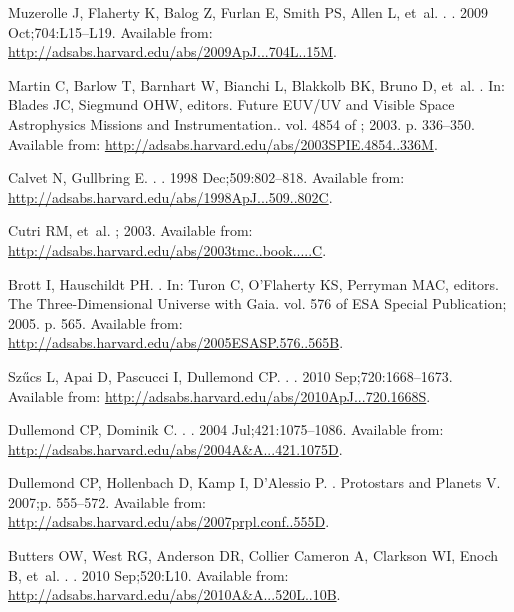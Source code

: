 \documentclass[]{rsos}
\begin{document}
\begin{thebibliography}{10}
{Muzerolle} J, {Flaherty} K, {Balog} Z, {Furlan} E, {Smith} PS, {Allen} L,
  et~al.
.
\newblock \apjl. 2009 Oct;704:L15--L19.
\newblock Available from:
  \url{http://adsabs.harvard.edu/abs/2009ApJ...704L..15M}.

{Martin} C, {Barlow} T, {Barnhart} W, {Bianchi} L, {Blakkolb} BK, {Bruno} D,
  et~al.
.
\newblock In: {Blades} JC, {Siegmund} OHW, editors. Future EUV/UV and Visible
  Space Astrophysics Missions and Instrumentation.. vol. 4854 of \procspie;
  2003. p. 336--350.
\newblock Available from:
  \url{http://adsabs.harvard.edu/abs/2003SPIE.4854..336M}.

{Calvet} N, {Gullbring} E.
.
\newblock \apj. 1998 Dec;509:802--818.
\newblock Available from:
  \url{http://adsabs.harvard.edu/abs/1998ApJ...509..802C}.

{Cutri} RM, et~al.
; 2003.
\newblock Available from:
  \url{http://adsabs.harvard.edu/abs/2003tmc..book.....C}.

{Brott} I, {Hauschildt} PH.
.
\newblock In: {Turon} C, {O'Flaherty} KS, {Perryman} MAC, editors. The
  Three-Dimensional Universe with Gaia. vol. 576 of ESA Special Publication;
  2005. p. 565.
\newblock Available from:
  \url{http://adsabs.harvard.edu/abs/2005ESASP.576..565B}.

{Sz{\H u}cs} L, {Apai} D, {Pascucci} I, {Dullemond} CP.
.
\newblock \apj. 2010 Sep;720:1668--1673.
\newblock Available from:
  \url{http://adsabs.harvard.edu/abs/2010ApJ...720.1668S}.

{Dullemond} CP, {Dominik} C.
.
\newblock \aap. 2004 Jul;421:1075--1086.
\newblock Available from:
  \url{http://adsabs.harvard.edu/abs/2004A&A...421.1075D}.

{Dullemond} CP, {Hollenbach} D, {Kamp} I, {D'Alessio} P.
.
\newblock Protostars and Planets V. 2007;p. 555--572.
\newblock Available from:
  \url{http://adsabs.harvard.edu/abs/2007prpl.conf..555D}.

{Butters} OW, {West} RG, {Anderson} DR, {Collier Cameron} A, {Clarkson} WI,
  {Enoch} B, et~al.
.
\newblock \aap. 2010 Sep;520:L10.
\newblock Available from:
  \url{http://adsabs.harvard.edu/abs/2010A&A...520L..10B}.

\end{thebibliography}

%
\end{document}
